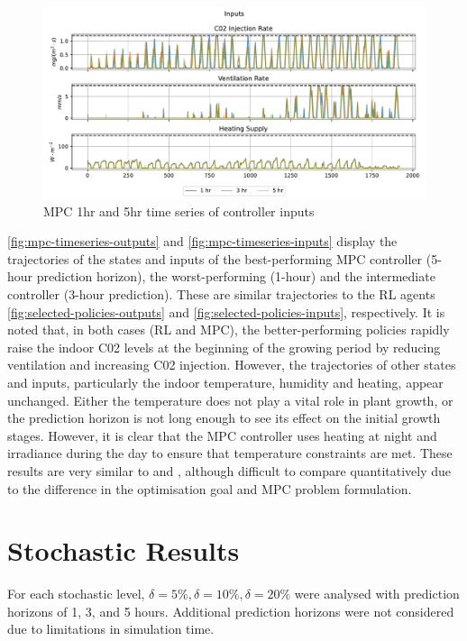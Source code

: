 \begin{figure}[H]
	\centering
	\includegraphics[width=\textwidth]{figures/mpc_inputs_times_series.pdf}
	\caption{MPC 1hr and 5hr time series of controller inputs}
	\label{fig:mpc-timeseries-inputs}
\end{figure}

\autoref{fig:mpc-timeseries-outputs} and \autoref{fig:mpc-timeseries-inputs} display the trajectories of the states and inputs of the best-performing MPC controller (5-hour prediction horizon), the worst-performing (1-hour) and the intermediate controller (3-hour prediction). These are similar trajectories to the RL agents \autoref{fig:selected-policies-outputs} and \autoref{fig:selected-policies-inputs}, respectively. It is noted that, in both cases (RL and MPC), the better-performing policies rapidly raise the indoor C02 levels at the beginning of the growing period by reducing ventilation and increasing C02 injection. However, the trajectories of other states and inputs, particularly the indoor temperature, humidity and heating, appear unchanged. Either the temperature does not play a vital role in plant growth, or the prediction horizon is not long enough to see its effect on the initial growth stages. However, it is clear that the MPC controller uses heating at night and irradiance during the day to ensure that temperature constraints are met. These results are very similar to \citet{morcegoReinforcementLearningModel2023} and \citet{boersmaRobustSamplebasedModel2022}, although difficult to compare quantitatively due to the difference in the optimisation goal and MPC problem formulation.


\section{Stochastic Results}
For each stochastic level, $\delta = 5\%, \delta = 10\%, \delta = 20\%$ were analysed with prediction horizons of 1, 3, and 5 hours. Additional prediction horizons were not considered due to limitations in simulation time.

